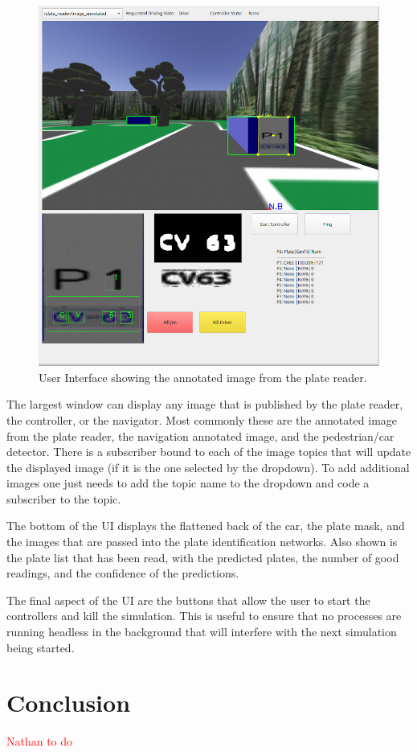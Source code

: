 \documentclass[titlepage, twocolumn]{article}
\newcommand{\red}[1]{\textcolor{red}{#1}}
\begin{document}
\begin{figure}[H]
\centering
\includegraphics[width=\linewidth]{Gui.png}
\caption{User Interface showing the annotated image from the plate reader.}
\label{fig:UI}
\end{figure}

The largest window can display any image that is published by the plate reader, the controller, or the navigator. Most commonly these are the annotated image from the plate reader, the navigation annotated image, and the pedestrian/car detector. There is a subscriber bound to each of the image topics that will update the displayed image (if it is the one selected by the dropdown). To add additional images one just needs to add the topic name to the dropdown and code a subscriber to the topic.

The bottom of the UI displays the flattened back of the car, the plate mask, and the images that are passed into the plate identification networks. Also shown is the plate list that has been read, with the predicted plates, the number of good readings, and the confidence of the predictions.

The final aspect of the UI are the buttons that allow the user to start the controllers and kill the simulation. This is useful to ensure that no processes are running headless in the background that will interfere with the next simulation being started. 

\section{Conclusion}

\red{Nathan to do}
\end{document}
